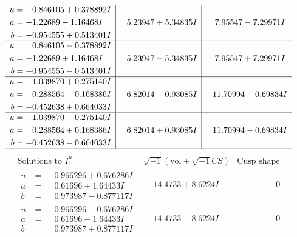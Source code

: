 \documentclass[1p]{elsarticle_modified}
\theoremstyle{definition}
\newcommand{\I}{\sqrt{-1}}
\begin{document}
$$\begin{array}{c|c|c}
\begin{aligned}
u &= \phantom{-}0.846105 + 0.378892 I \\
a &= -1.22689 - 1.16468 I \\
b &= -0.954555 + 0.513401 I\end{aligned}
 & \phantom{-}5.23947 + 5.34835 I & \phantom{-}7.95547 - 7.29971 I \\ \hline\begin{aligned}
u &= \phantom{-}0.846105 - 0.378892 I \\
a &= -1.22689 + 1.16468 I \\
b &= -0.954555 - 0.513401 I\end{aligned}
 & \phantom{-}5.23947 - 5.34835 I & \phantom{-}7.95547 + 7.29971 I \\ \hline\begin{aligned}
u &= -1.039870 + 0.275140 I \\
a &= \phantom{-}0.288564 - 0.168386 I \\
b &= -0.452638 + 0.664033 I\end{aligned}
 & \phantom{-}6.82014 - 0.93085 I & \phantom{-}11.70994 + 0.69834 I \\ \hline\begin{aligned}
u &= -1.039870 - 0.275140 I \\
a &= \phantom{-}0.288564 + 0.168386 I \\
b &= -0.452638 - 0.664033 I\end{aligned}
 & \phantom{-}6.82014 + 0.93085 I & \phantom{-}11.70994 - 0.69834 I\\
 \hline 
 \end{array}$$\newpage$$\begin{array}{c|c|c}  
\text{Solutions to }I^u_{1}& \I (\text{vol} + \sqrt{-1}CS) & \text{Cusp shape}\\
 \hline 
\begin{aligned}
u &= \phantom{-}0.966296 + 0.676286 I \\
a &= \phantom{-}0.61696 + 1.64433 I \\
b &= \phantom{-}0.973987 - 0.877117 I\end{aligned}
 & \phantom{-}14.4733 + 8.6224 I & \phantom{-0.000000 } 0 \\ \hline\begin{aligned}
u &= \phantom{-}0.966296 - 0.676286 I \\
a &= \phantom{-}0.61696 - 1.64433 I \\
b &= \phantom{-}0.973987 + 0.877117 I\end{aligned}
 & \phantom{-}14.4733 - 8.6224 I & \phantom{-0.000000 } 0 \\ \hline\begin{aligned}

\end{aligned}
\end{array}$$
\end{document}
